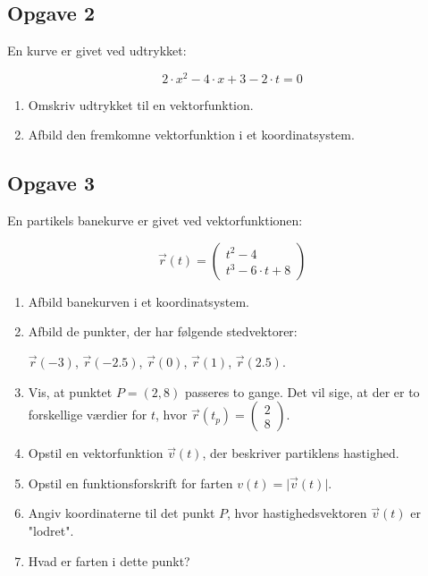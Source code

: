 \documentclass[a4paper, 12pt]{article}
\begin{document}
\subsection*{Opgave 2}
\label{sec:orgfacec98}

En kurve er givet ved udtrykket:

$$2 \cdot x^2 - 4 \cdot x + 3 - 2\cdot t = 0$$

\begin{enumerate}
\item Omskriv udtrykket til en vektorfunktion.

\item Afbild den fremkomne vektorfunktion i et koordinatsystem.
\end{enumerate}

\subsection*{Opgave 3}
\label{sec:orgbf8eb28}

En partikels banekurve er givet ved vektorfunktionen:

$$\vec{r}(t) = \begin{pmatrix} t^2 - 4 \\ t^3 - 6\cdot t +8 \end{pmatrix}$$

\begin{enumerate}
\item Afbild banekurven i et koordinatsystem.

\item Afbild de punkter, der har følgende stedvektorer:

\(\vec{r}(-3)\), \(\vec{r}(-2.5)\), \(\vec{r}(0)\), \(\vec{r}(1)\), \(\vec{r}(2.5)\).

\item Vis, at punktet \(P=(2,8)\) passeres to gange. Det vil sige, at der er to forskellige værdier for \(t\), hvor \(\vec{r}(t_p) = \begin{pmatrix} 2 \\ 8 \end{pmatrix}\).

\item Opstil en vektorfunktion \(\vec{v}(t)\), der beskriver partiklens hastighed.

\item Opstil en funktionsforskrift for farten \(v(t) = \lvert \vec{v}(t)\rvert\).

\item Angiv koordinaterne til det punkt \(P\), hvor hastighedsvektoren \(\vec{v}(t)\) er "lodret".

\item Hvad er farten i dette punkt?
\end{enumerate}
\end{document}
